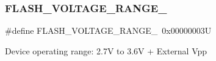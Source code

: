 \subsubsection{\texorpdfstring{F\+L\+A\+S\+H\+\_\+\+V\+O\+L\+T\+A\+G\+E\+\_\+\+R\+A\+N\+G\+E\+\_}{FLASH\_VOLTAGE\_RANGE\_4}}
{\footnotesize\ttfamily \#define F\+L\+A\+S\+H\+\_\+\+V\+O\+L\+T\+A\+G\+E\+\_\+\+R\+A\+N\+G\+E\+\_~0x00000003U}

Device operating range\+: 2.\+7V to 3.\+6V + External Vpp 